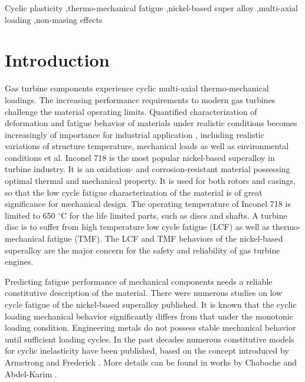 \documentclass[preprint,5p,twocolumn,11pt,sort&compress]{elsarticle}
\begin{document}
\begin{frontmatter}
%
\begin{keyword}
Cyclic plasticity \sep thermo-mechanical fatigue  \sep nickel-based super alloy  \sep multi-axial loading \sep non-masing effects
\end{keyword}
\end{frontmatter}

\section{Introduction}
\noindent Gas turbine components experience cyclic multi-axial thermo-mechanical loadings. The increasing performance requirements to modern gas turbines challenge  the material operating limits. Quantified characterization of deformation and fatigue behavior of materials under realistic conditions becomes increasingly of importance for industrial application \cite{harrison1996modelling}, including realistic variations of structure temperature, mechanical loads as well as environmental conditions et al. Inconel 718 is the most popular nickel-based superalloy in turbine industry. It is an oxidation- and corrosion-resistant material possessing optimal thermal and mechanical property. It is used for both rotors and casings, so that the low cycle fatigue characterization of the material is of great significance for mechanical design. The operating temperature of Inconel 718 is limited to 650 $^{\circ}$C for the life limited parts, such as discs and shafts.
A turbine disc is to suffer from high temperature low cycle fatigue (LCF) as well as thermo-mechanical fatigue (TMF).
The LCF and TMF behaviors of the nickel-based superalloy are the major concern for the safety and reliability of gas turbine engines.

Predicting fatigue performance of mechanical components needs a reliable constitutive description of the material.  There were numerous studies on low cycle fatigue of the nickel-based superalloy published.
It is known that the cyclic loading mechanical behavior significantly differs from that under the monotonic loading condition. Engineering metals do not possess stable mechanical behavior until sufficient loading cycles. In the past decades numerous constitutive models for cyclic inelasticity \cite{ohno1993kinematic, Pun2014138, AbdelKarim2000225, Kang2004299} have been published, based on the concept introduced by Armstrong and Frederick \cite{armstrong1966mathematical}. More details can be found in works by Chaboche  \cite{Chaboche20081642} and Abdel-Karim  \cite{AbdelKarim2010711}.
\end{document}
